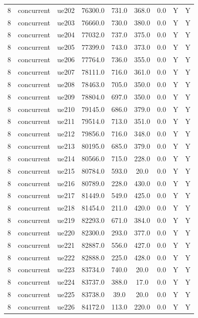 \begin{table}[ht]
\begin{tabular}{|c|c|c|c|c|c|c|c|c|}
8 & concurrent & ue202 & 76300.0 & 731.0 & 368.0 & 0.0 & Y & Y \\
8 & concurrent & ue203 & 76660.0 & 730.0 & 380.0 & 0.0 & Y & Y \\
8 & concurrent & ue204 & 77032.0 & 737.0 & 375.0 & 0.0 & Y & Y \\
8 & concurrent & ue205 & 77399.0 & 743.0 & 373.0 & 0.0 & Y & Y \\
8 & concurrent & ue206 & 77764.0 & 736.0 & 355.0 & 0.0 & Y & Y \\
8 & concurrent & ue207 & 78111.0 & 716.0 & 361.0 & 0.0 & Y & Y \\
8 & concurrent & ue208 & 78463.0 & 705.0 & 350.0 & 0.0 & Y & Y \\
8 & concurrent & ue209 & 78804.0 & 697.0 & 350.0 & 0.0 & Y & Y \\
8 & concurrent & ue210 & 79145.0 & 686.0 & 379.0 & 0.0 & Y & Y \\
8 & concurrent & ue211 & 79514.0 & 713.0 & 351.0 & 0.0 & Y & Y \\
8 & concurrent & ue212 & 79856.0 & 716.0 & 348.0 & 0.0 & Y & Y \\
8 & concurrent & ue213 & 80195.0 & 685.0 & 379.0 & 0.0 & Y & Y \\
8 & concurrent & ue214 & 80566.0 & 715.0 & 228.0 & 0.0 & Y & Y \\
8 & concurrent & ue215 & 80784.0 & 593.0 & 20.0 & 0.0 & Y & Y \\
8 & concurrent & ue216 & 80789.0 & 228.0 & 430.0 & 0.0 & Y & Y \\
8 & concurrent & ue217 & 81449.0 & 549.0 & 425.0 & 0.0 & Y & Y \\
8 & concurrent & ue218 & 81454.0 & 211.0 & 420.0 & 0.0 & Y & Y \\
8 & concurrent & ue219 & 82293.0 & 671.0 & 384.0 & 0.0 & Y & Y \\
8 & concurrent & ue220 & 82300.0 & 293.0 & 377.0 & 0.0 & Y & Y \\
8 & concurrent & ue221 & 82887.0 & 556.0 & 427.0 & 0.0 & Y & Y \\
8 & concurrent & ue222 & 82888.0 & 225.0 & 428.0 & 0.0 & Y & Y \\
8 & concurrent & ue223 & 83734.0 & 740.0 & 20.0 & 0.0 & Y & Y \\
8 & concurrent & ue224 & 83737.0 & 388.0 & 17.0 & 0.0 & Y & Y \\
8 & concurrent & ue225 & 83738.0 & 39.0 & 20.0 & 0.0 & Y & Y \\
8 & concurrent & ue226 & 84172.0 & 113.0 & 220.0 & 0.0 & Y & Y \\

\end{tabular}
\end{table}
